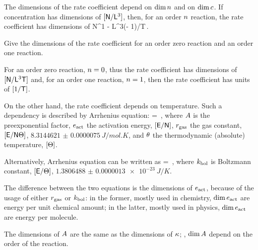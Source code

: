 The dimensions of the rate coefficient depend on $\dim n$ and on $\dim\conc{}$. If concentration has dimensions of $[\mathsf{N}/\mathsf{L}^3]$, then, for an order $n$ reaction, the rate coefficient has dimensions of 
\beq
\phdim N^{1 - \rorder}\phdim L^{3(\rorder - 1)}/\phdim T\,.
\eeq

\begin{example}
Give the dimensions of the rate coefficient for an order zero reaction and an order one reaction.
\end{example}

\begin{solution}
For an order zero reaction, $n = 0$, thus the rate coefficient has dimensions of $[\mathsf{N}/\mathsf{L}^3\mathsf{T}]$ and, for an order one reaction, $n = 1$, then the rate coefficient has units of $[1/\mathsf{T}]$.
\end{solution}

On the other hand, the rate coefficient depends on temperature. Such a dependency is described by Arrhenius equation:
\beq
\krcoeff\vat\temp = \freqfact\exp{}\,,
\eeq
where $A$ is the preexponential factor, $e_\text{act}$ the activation energy, $[\mathsf{E}/\mathsf{N}]$, $r_\text{gas}$ the gas constant, $[\mathsf{E}/\mathsf{N}\Theta]$, $\SI{8.3144621(75)}{J/mol.K}$, and $\theta$ the thermodynamic (absolute) temperature, $[\Theta]$.

Alternatively, Arrhenius equation can be written as
\beq
\krcoeff\vat\temp = \freqfact\exp{}\,,
\eeq
where $k_\text{bol}$ is Boltzmann constant, $[\mathsf{E}/\Theta]$, $\SI{1.3806488(13)e-23}{J/K}$.

The difference between the two equations is the dimensions of $e_\text{act}$, because of the usage of either $r_\text{gas}$ or $k_\text{bol}$: in the former, mostly used in chemistry, $\dim e_\text{act}$ are energy per unit chemical amount; in the latter, mostly used in physics, $\dim e_\text{act}$ are energy per molecule.

The dimensions of $A$ are the same as the dimensions of $\kappa$; \ie, $\dim A$ depend on the order of the reaction.
